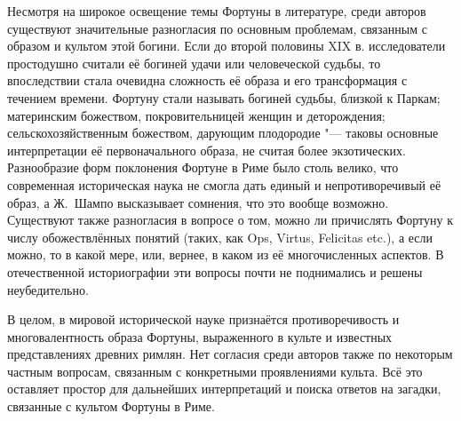 
Несмотря на широкое освещение темы Фортуны в литературе, среди авторов существуют значительные разногласия по основным проблемам, связанным с образом и культом этой богини. Если до второй половины XIX в. исследователи простодушно считали её богиней удачи или человеческой судьбы, то впоследствии стала очевидна сложность её образа и его трансформация с течением времени. Фортуну стали называть богиней судьбы, близкой к Паркам; материнским божеством, покровительницей женщин и деторождения; сельскохозяйственным божеством, дарующим плодородие "--- таковы основные интерпретации её первоначального образа, не считая более экзотических. Разнообразие форм поклонения Фортуне в Риме было столь велико, что современная историческая наука не смогла дать единый и непротиворечивый её образ, а Ж.~Шампо высказывает сомнения, что это вообще возможно. Существуют также разногласия в вопросе о том, можно ли причислять Фортуну к числу обожествлённых понятий (таких, как Ops, Virtus, Felicitas etc.), а если можно, то в какой мере, или, вернее, в каком из её многочисленных аспектов. В отечественной историографии эти вопросы почти не поднимались и решены неубедительно.

В целом, в мировой исторической науке признаётся противоречивость и многовалентность образа Фортуны, выраженного в культе и известных представлениях древних римлян. Нет согласия среди авторов также по некоторым частным вопросам, связанным с конкретными проявлениями культа. Всё это оставляет простор для дальнейших интерпретаций и поиска ответов на загадки, связанные с культом Фортуны в Риме.



